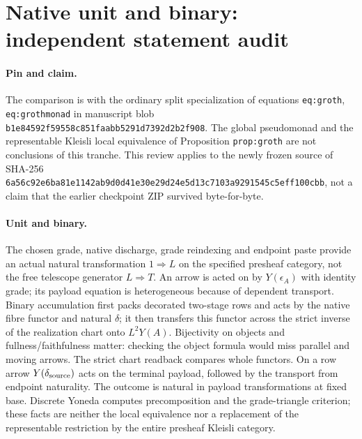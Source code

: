 \documentclass{article}
\begin{document}
\section*{Native unit and binary: independent statement audit}
\paragraph{Pin and claim.} The comparison is with the ordinary split
specialization of equations \texttt{eq:groth}, \texttt{eq:grothmonad} in
manuscript blob \texttt{b1e84592f59558c851faabb5291d7392d2b2f908}.
The global pseudomonad and the representable Kleisli local equivalence
of Proposition \texttt{prop:groth} are not conclusions of this tranche.
This review applies to the newly frozen source of SHA-256
\texttt{6a56c92e6ba81e1142ab9d0d41e30e29d24e5d13c7103a9291545c5eff100cbb},
not a claim that the earlier checkpoint ZIP survived byte-for-byte.
\paragraph{Unit and binary.} The chosen grade, native discharge, grade
reindexing and endpoint paste provide an actual natural transformation
$1\Rightarrow L$ on the specified presheaf category, not the free
telescope generator $L\Rightarrow T$. An arrow is acted on by
$Y(\epsilon_A)$ with identity grade; its payload equation is heterogeneous
because of dependent transport. Binary accumulation first packs decorated
two-stage rows and acts by the native fibre functor and natural
$\delta$; it then transfers this functor across the strict inverse of
the realization chart onto $L^2Y(A)$. Bijectivity on objects and
fullness/faithfulness matter: checking the object formula would miss
parallel and moving arrows. The strict chart readback compares whole
functors. On a row arrow $Y(\delta_{\rm source})$ acts on the terminal
payload, followed by the transport from endpoint naturality. The outcome
is natural in payload transformations at fixed base. Discrete Yoneda
computes precomposition and the grade-triangle criterion; these facts are
neither the local equivalence nor a replacement of the representable
restriction by the entire presheaf Kleisli category.
\end{document}
